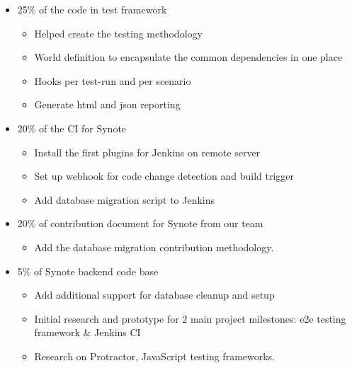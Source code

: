 \begin{itemize}
	\item 25\% of the code in test framework
		\begin{itemize}
			\item Helped create the testing methodology
			\item World definition to encapsulate the common dependencies in one place
			\item Hooks per test-run and per scenario 
			\item Generate html and json reporting
		\end{itemize}
	\item 20\% of the CI for Synote
		\begin{itemize}
			\item Install the first plugins for Jenkins on remote server
			\item Set up webhook for code change detection and build trigger
			\item Add database migration script to Jenkins
		\end{itemize}		 
	\item 20\% of contribution document for Synote from our team
		\begin{itemize}
			\item Add the database migration contribution methodology.
		\end{itemize}
	\item 5\% of Synote backend code base
		\begin{itemize}
			\item Add additional support for database cleanup and setup
			\item Initial research and prototype for 2 main project milestones: e2e testing framework \& Jenkins CI
			\item Research on Protractor, JavaScript testing frameworks.
		\end{itemize}
\end{itemize}





